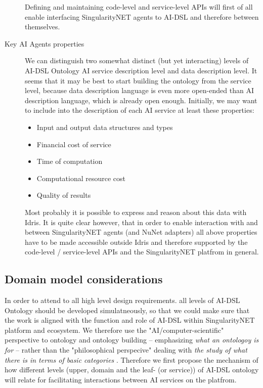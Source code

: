 \documentclass[]{report}
\begin{document}
\begin{description}
  Defining and maintaining code-level and service-level APIs will first of all
  enable interfacing SingularityNET agents to AI-DSL and therefore between
  themselves.

  \item[Key AI Agents properties] We can distinguish two somewhat distinct (but
  yet interacting) levels of AI-DSL Ontology AI service description level and
  data description level. It seems that it may be best to start building the
  ontology from the service level, because data description language is even
  more open-ended than AI description language, which is already open enough.
  Initially, we may want to include into the description of each AI service at
  least these properties: \begin{itemize} \item Input and output data structures
  and types \item Financial cost of service \item Time of computation \item
  Computational resource cost \item Quality of results \end{itemize} Most
  probably it is possible to express and reason about this data with Idris. It
  is quite clear however, that in order to enable interaction with and between
  SingularityNET agents (and NuNet adapters) all above properties have to be
  made accessible outside Idris and therefore supported by the code-level /
  service-level APIs and the SingularityNET platfrom in general.

\end{description}

\subsection{Domain model considerations}

In order to attend to all high level design requirements. all levels of AI-DSL
Ontology should be developed simulatneously, so that we could make sure that the
work is aligned with the function and role of AI-DSL within SingularityNET
platform and ecosystem. We therefore use the "AI/computer-scientific"
perspective to ontology and ontology building -- emphasizing \textit{what an
ontologoy is for} -- rather than the "philosophical perspecive" dealing with
\textit{the study of what there is in terms of basic categories}
\cite{gruber_translation_1993,sep-logic-ontology}. Therefore we first propose
the  mechanism of how different levels (upper, domain and the leaf- (or
service)) of AI-DSL ontology will relate for facilitating interactions between
AI services on the platfrom.
\end{document}
